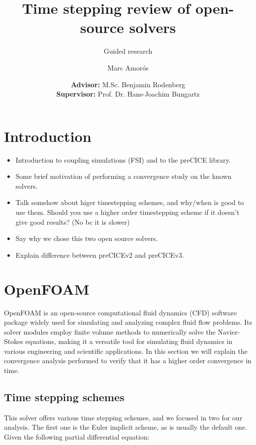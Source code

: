 \documentclass[
  english,        %
  font=times,     %
  onecolumn,      %
]{tumarticle}
\title{Time stepping review of open-source solvers}
\subtitle{Guided research}
\author[email=marc.amoros@tum.de]{Marc Amorós}
\date{
    \small
    \textbf{Advisor:} M.Sc. Benjamin Rodenberg \\
    \textbf{Supervisor:} Prof. Dr. Hans-Joachim Bungartz \\
}
\begin{document}
\maketitle


\section{Introduction}
\begin{itemize}
    \item Introduction to coupling simulations (FSI) and to the preCICE library. 
    \item Some brief motivation of performing a convergence study on the known solvers.
    \item Talk somehow about higer timestepping schemes, and why/when is good to use them. Should you use a higher order timestepping scheme if it doesn't give good results? (No bc it is slower) 
    \item Say why we chose this two open source solvers.
    \item Explain difference between preCICEv2 and preCICEv3.
\end{itemize}


\section{OpenFOAM}

OpenFOAM is an open-source computational fluid dynamics (CFD) software package widely used for simulating and analyzing complex fluid flow problems. Its solver modules employ finite volume methods to numerically solve the Navier-Stokes equations, making it a versatile tool for simulating fluid dynamics in various engineering and scientific applications. In this section we will explain the convergence analysis performed to verify that it has a higher order convergence in time.   

\subsection{Time stepping schemes}
This solver offers various time stepping schemes, and we focused in two for our analysis. The first one is the Euler implicit scheme, as is usually the default one. Given the following partial differential equation:
\end{document}
